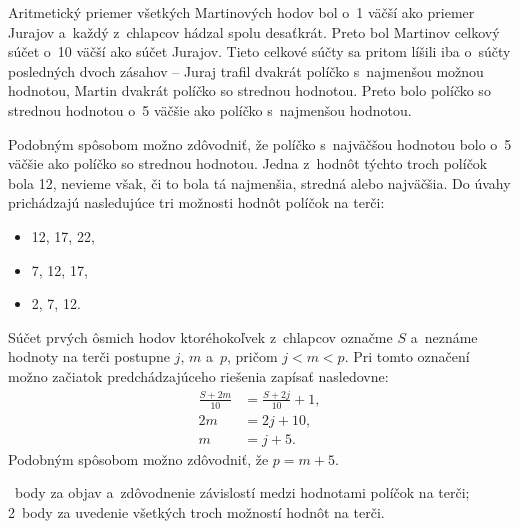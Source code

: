 {%
Aritmetický priemer všetkých Martinových hodov bol o~1 väčší ako priemer Jurajov
a~každý z~chlapcov hádzal spolu desaťkrát.
Preto bol Martinov celkový súčet o~10 väčší ako súčet Jurajov.
Tieto celkové súčty sa pritom líšili iba o~súčty posledných dvoch zásahov
-- Juraj trafil dvakrát políčko s~najmenšou možnou hodnotou, Martin dvakrát
políčko so strednou hodnotou.
Preto bolo políčko so strednou hodnotou o~5 väčšie ako políčko s~najmenšou hodnotou.

Podobným spôsobom možno zdôvodniť, že políčko s~najväčšou hodnotou bolo o~5 väčšie
ako políčko so strednou hodnotou.
Jedna z~hodnôt týchto troch políčok bola 12, nevieme však, či to bola tá najmenšia,
stredná alebo najväčšia.
Do úvahy prichádzajú nasledujúce tri možnosti hodnôt políčok na terči:
\begin{itemize}
\item 12, 17, 22,
\item 7, 12, 17,
\item 2, 7, 12.
\end{itemize}

\poznamka
Súčet prvých ôsmich hodov ktoréhokoľvek z~chlapcov označme $S$ a~neznáme hodnoty
na terči postupne $j$, $m$ a~$p$, pričom $j<m<p$.
Pri tomto označení možno začiatok predchádzajúceho riešenia zapísať nasledovne:
$$
\begin{aligned}
\frac{S+2m}{10}&=\frac{S+2j}{10}+1,\\
2m&=2j+10,\\
m&=j+5.
\end{aligned}
$$
Podobným spôsobom možno zdôvodniť, že $p=m+5$.

~body za objav a~zdôvodnenie závislostí medzi hodnotami políčok na terči;
2~body za uvedenie všetkých troch možností hodnôt na terči.
\endhodnotenie
}

